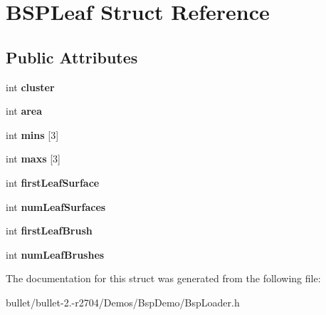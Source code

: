 \hypertarget{struct_b_s_p_leaf}{\section{B\+S\+P\+Leaf Struct Reference}
\label{struct_b_s_p_leaf}
}
\subsection*{Public Attributes}
\begin{DoxyCompactItemize}
\item 
\hypertarget{struct_b_s_p_leaf_a78c7d556f09035e864ff18dc3a132b39}{int {\bfseries cluster}}\label{struct_b_s_p_leaf_a78c7d556f09035e864ff18dc3a132b39}

\item 
\hypertarget{struct_b_s_p_leaf_a40f013da2f8e398eac788368ee510145}{int {\bfseries area}}\label{struct_b_s_p_leaf_a40f013da2f8e398eac788368ee510145}

\item 
\hypertarget{struct_b_s_p_leaf_a72b8e07e8d8ba5534d988d4bae1b5c57}{int {\bfseries mins} \mbox{[}3\mbox{]}}\label{struct_b_s_p_leaf_a72b8e07e8d8ba5534d988d4bae1b5c57}

\item 
\hypertarget{struct_b_s_p_leaf_a6e99d75137a69dea841a2a46a2e14a22}{int {\bfseries maxs} \mbox{[}3\mbox{]}}\label{struct_b_s_p_leaf_a6e99d75137a69dea841a2a46a2e14a22}

\item 
\hypertarget{struct_b_s_p_leaf_ac3370f42fc067cc0f14d2fac77f98a9d}{int {\bfseries first\+Leaf\+Surface}}\label{struct_b_s_p_leaf_ac3370f42fc067cc0f14d2fac77f98a9d}

\item 
\hypertarget{struct_b_s_p_leaf_a85a7b903d083058f13d3c3f8c58783d8}{int {\bfseries num\+Leaf\+Surfaces}}\label{struct_b_s_p_leaf_a85a7b903d083058f13d3c3f8c58783d8}

\item 
\hypertarget{struct_b_s_p_leaf_aec126aa5f2479ae17f25d233d3c75751}{int {\bfseries first\+Leaf\+Brush}}\label{struct_b_s_p_leaf_aec126aa5f2479ae17f25d233d3c75751}

\item 
\hypertarget{struct_b_s_p_leaf_aa5c9e85936012ffda605a5b66747fb54}{int {\bfseries num\+Leaf\+Brushes}}\label{struct_b_s_p_leaf_aa5c9e85936012ffda605a5b66747fb54}

\end{DoxyCompactItemize}


The documentation for this struct was generated from the following file\+:\begin{DoxyCompactItemize}
\item 
bullet/bullet-\/2.-\/r2704/\+Demos/\+Bsp\+Demo/Bsp\+Loader.\+h\end{DoxyCompactItemize}
